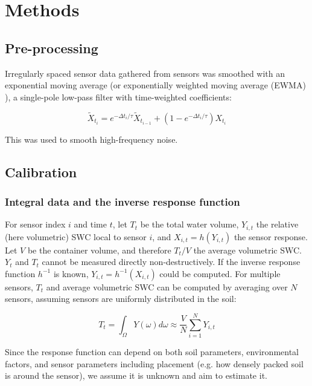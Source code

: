 \documentclass[11pt]{article}
\begin{document}
\section{Methods}

\subsection{Pre-processing}

Irregularly spaced sensor data gathered from sensors was smoothed with an exponential moving average \cite{genccay2001introduction} (or exponentially weighted moving average (EWMA) \cite{zumbach2001operators}), a single-pole low-pass filter \cite{smith1997scientist} with time-weighted coefficients:

\[
\tilde{X}_{t_i} = e^{-\Delta t_i/\tau} \tilde{X}_{t_{i-1}} + (1-e^{-\Delta t_i/\tau}) X_{t_i}
\]

This was used to smooth high-frequency noise.

\subsection{Calibration}

\subsubsection{Integral data and the inverse response function}

For sensor index $i$ and time $t$, let $T_t$ be the total water volume, $Y_{i,t}$ the relative (here volumetric) SWC local to sensor $i$, and $X_{i, t} = h(Y_{i,t})$ the sensor response. Let $V$ be the container volume, and therefore $T_t/V$ the average volumetric SWC. $Y_t$ and $T_t$ cannot be measured directly non-destructively. If the inverse response function $h^{-1}$ is known, $Y_{i,t} = h^{-1}(X_{i,t})$ could be computed. For multiple sensors, $T_t$ and average volumetric SWC can be computed by averaging over $N$ sensors, assuming sensors are uniformly distributed in the soil:

\begin{equation}
T_t = \int_{\Omega} Y(\omega) d\omega \approx \frac{V}{N} \sum_{i=1}^N Y_{i,t}
\end{equation}

Since the response function can depend on both soil parameters, environmental factors, and sensor parameters including placement (e.g. how densely packed soil is around the sensor), we assume it is unknown and aim to estimate it.
\end{document}
